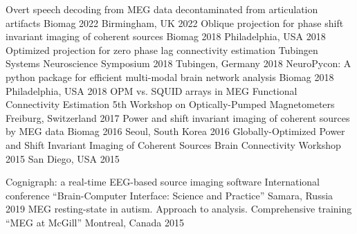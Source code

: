 \begin{cventries}
    \cvconf
    {Overt speech decoding from MEG data decontaminated from articulation artifacts}
    {Biomag 2022}
    {Birmingham, UK}
    {2022}
    \cvconf
    {Oblique projection for phase shift invariant imaging of coherent sources}
    {Biomag 2018}
    {Philadelphia, USA}
    {2018}
    \cvconf
    {Optimized projection for zero phase lag connectivity estimation}
    {Tubingen Systems Neuroscience Symposium 2018}
    {Tubingen, Germany}
    {2018}
    \cvconf
    {NeuroPycon: A python package for efficient multi-modal brain network analysis}
    {Biomag 2018}
    {Philadelphia, USA}
    {2018}
    \cvconf
    {OPM vs. SQUID arrays in MEG Functional Connectivity Estimation}
    {5th Workshop on Optically-Pumped Magnetometers}
    {Freiburg, Switzerland}
    {2017}
    \cvconf
    {Power and shift invariant imaging of coherent sources by MEG data}
    {Biomag 2016}
    {Seoul, South Korea}
    {2016}
    \cvconf
    {Globally-Optimized Power and Shift Invariant Imaging of Coherent Sources}
    {Brain Connectivity Workshop 2015}
    {San Diego, USA}
    {2015}
\end{cventries}
\begin{cventries}
  \cvconf
    {Cognigraph: a real-time EEG-based source imaging software}
    {International conference ``Brain-Computer Interface: Science and Practice''}
    {Samara, Russia}
    {2019}
  \cvconf
    {MEG resting-state in autism. Approach to analysis.}
    {Comprehensive training ``MEG at McGill''}
    {Montreal, Canada}
    {2015}
\end{cventries}
